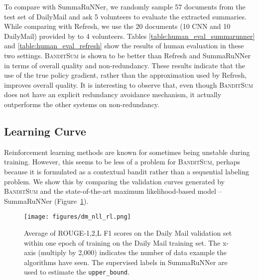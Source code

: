 \documentclass[11pt,a4paper]{article}
\newcommand{\B}{\textsc{BanditSum }}
\newcommand{\Bnospace}{\textsc{BanditSum}}
\begin{document}
To compare with SummaRuNNer, we randomly sample 57 documents from the test set of DailyMail and ask 5 volunteers to evaluate the extracted summaries.
While comparing with Refresh, we use the 20 documents (10 CNN and 10 DailyMail) provided by \citet{DBLP:Narayan/2018} to 4 volunteers. Tables \ref{table:human_eval_summarunner} and \ref{table:human_eval_refresh} show the results of human evaluation in these two settings. \B is shown to be better than Refresh and SummaRuNNer in terms of overall quality and non-redundancy. These results indicate that the use of the true policy gradient, rather than the approximation used by Refresh, improves overall quality. It is interesting to observe that, even though \B does not have an explicit redundancy avoidance mechanism, it actually outperforms the other systems on non-redundancy.



 


















\subsection{Learning Curve}
Reinforcement learning methods are known for sometimes being unstable during training. However, this seems to be less of a problem for \Bnospace, perhaps because it is formulated as a contextual bandit rather than a sequential labeling problem. We show this by comparing the validation curves generated by \B and the state-of-the-art maximum likelihood-based model -- SummaRuNNer \citep{ext5_summarunner} (Figure~\ref{fig:train_efficiency}).

\begin{figure}[!h]
  \texttt{[image: figures/dm\_nll\_rl.png]}
  \caption[Caption for LOF]{Average of ROUGE-1,2,L F1 scores on the Daily Mail validation set within one epoch of training on the Daily Mail training set. The x-axis (multiply by 2,000) indicates the number of data example the algorithms have seen. The supervised labels in SummaRuNNer are used to estimate the \texttt{upper\_bound}.}
  \label{fig:train_efficiency}
\end{figure}
\end{document}

